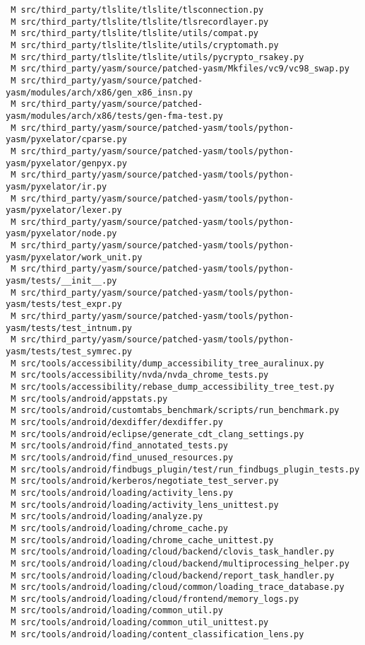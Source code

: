 \documentclass{article}
\begin{document}
\begin{verbatim}
 M src/third_party/tlslite/tlslite/tlsconnection.py
 M src/third_party/tlslite/tlslite/tlsrecordlayer.py
 M src/third_party/tlslite/tlslite/utils/compat.py
 M src/third_party/tlslite/tlslite/utils/cryptomath.py
 M src/third_party/tlslite/tlslite/utils/pycrypto_rsakey.py
 M src/third_party/yasm/source/patched-yasm/Mkfiles/vc9/vc98_swap.py
 M src/third_party/yasm/source/patched-yasm/modules/arch/x86/gen_x86_insn.py
 M src/third_party/yasm/source/patched-yasm/modules/arch/x86/tests/gen-fma-test.py
 M src/third_party/yasm/source/patched-yasm/tools/python-yasm/pyxelator/cparse.py
 M src/third_party/yasm/source/patched-yasm/tools/python-yasm/pyxelator/genpyx.py
 M src/third_party/yasm/source/patched-yasm/tools/python-yasm/pyxelator/ir.py
 M src/third_party/yasm/source/patched-yasm/tools/python-yasm/pyxelator/lexer.py
 M src/third_party/yasm/source/patched-yasm/tools/python-yasm/pyxelator/node.py
 M src/third_party/yasm/source/patched-yasm/tools/python-yasm/pyxelator/work_unit.py
 M src/third_party/yasm/source/patched-yasm/tools/python-yasm/tests/__init__.py
 M src/third_party/yasm/source/patched-yasm/tools/python-yasm/tests/test_expr.py
 M src/third_party/yasm/source/patched-yasm/tools/python-yasm/tests/test_intnum.py
 M src/third_party/yasm/source/patched-yasm/tools/python-yasm/tests/test_symrec.py
 M src/tools/accessibility/dump_accessibility_tree_auralinux.py
 M src/tools/accessibility/nvda/nvda_chrome_tests.py
 M src/tools/accessibility/rebase_dump_accessibility_tree_test.py
 M src/tools/android/appstats.py
 M src/tools/android/customtabs_benchmark/scripts/run_benchmark.py
 M src/tools/android/dexdiffer/dexdiffer.py
 M src/tools/android/eclipse/generate_cdt_clang_settings.py
 M src/tools/android/find_annotated_tests.py
 M src/tools/android/find_unused_resources.py
 M src/tools/android/findbugs_plugin/test/run_findbugs_plugin_tests.py
 M src/tools/android/kerberos/negotiate_test_server.py
 M src/tools/android/loading/activity_lens.py
 M src/tools/android/loading/activity_lens_unittest.py
 M src/tools/android/loading/analyze.py
 M src/tools/android/loading/chrome_cache.py
 M src/tools/android/loading/chrome_cache_unittest.py
 M src/tools/android/loading/cloud/backend/clovis_task_handler.py
 M src/tools/android/loading/cloud/backend/multiprocessing_helper.py
 M src/tools/android/loading/cloud/backend/report_task_handler.py
 M src/tools/android/loading/cloud/common/loading_trace_database.py
 M src/tools/android/loading/cloud/frontend/memory_logs.py
 M src/tools/android/loading/common_util.py
 M src/tools/android/loading/common_util_unittest.py
 M src/tools/android/loading/content_classification_lens.py

\end{verbatim}
\end{document}
